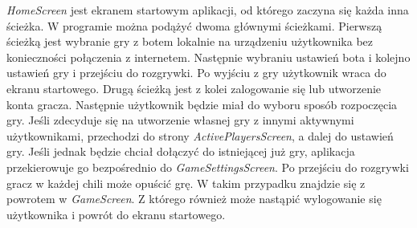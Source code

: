 \emph{HomeScreen} jest ekranem startowym aplikacji, od którego zaczyna się każda inna ścieżka. W programie można podążyć dwoma głównymi ścieżkami. Pierwszą ścieżką jest wybranie gry z botem lokalnie na urządzeniu użytkownika bez konieczności połączenia z internetem. Następnie wybraniu ustawień bota i kolejno ustawień gry i przejściu do rozgrywki. Po wyjściu z gry użytkownik wraca do ekranu startowego. Drugą ścieżką jest z kolei zalogowanie się lub utworzenie konta gracza. Następnie użytkownik będzie miał do wyboru sposób rozpoczęcia gry. Jeśli zdecyduje się na utworzenie własnej gry z innymi aktywnymi użytkownikami, przechodzi do strony \emph{ActivePlayersScreen}, a dalej do ustawień gry. Jeśli jednak będzie chciał dołączyć do istniejącej już gry, aplikacja przekierowuje go bezpośrednio do \emph{GameSettingsScreen}. Po przejściu do rozgrywki gracz w każdej chili może opuścić grę. W takim przypadku znajdzie się z powrotem w \emph{GameScreen}. Z którego również może nastąpić wylogowanie się użytkownika i powrót do ekranu startowego. \\ \\ 

